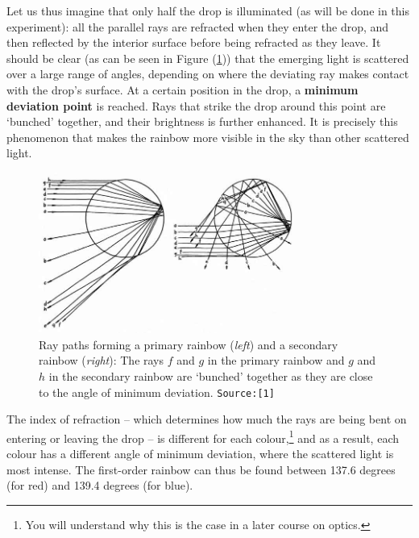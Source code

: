 Let us thus imagine that only half the drop is illuminated (as will be done in this experiment): all the parallel rays are refracted when they enter the drop, and then reflected by the interior surface before being refracted as they leave. It should be clear (as can be seen in Figure (\ref{fig:rainbowDeviation})) that the emerging light is scattered over a large range of angles, depending on where the deviating ray makes contact with the drop's surface. At a certain position in the drop, a \textbf{minimum deviation point} is reached. Rays that strike the drop around this point are `bunched' together, and their brightness is further enhanced. It is precisely this phenomenon that makes the rainbow more visible in the sky than other scattered light. 


\begin{figure}[!htb]
    \centering
    \includegraphics[width=0.75\textwidth]{figs/rainbowDeviation.jpeg}
    \caption{Ray paths forming a primary rainbow (\textit{left}) and a secondary rainbow (\textit{right}): The rays $f$ and $g$ in the primary rainbow and $g$ and $h$ in the secondary rainbow are `bunched' together as they are close to the angle of minimum deviation. \texttt{Source:[1]}}
    \label{fig:rainbowDeviation}
\end{figure}

\begin{imp}
The index of refraction -- which determines how much the rays are being bent on entering or leaving the drop -- is different for each colour,\footnote{You will understand why this is the case in a later course on optics.} and as a result, each colour has a different angle of minimum deviation, where the scattered light is most intense. The first-order rainbow can thus be found between 137.6 degrees (for red) and 139.4 degrees (for blue).
\end{imp}

